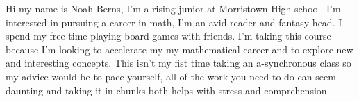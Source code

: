 Hi my name is Noah Berns, I’m a rising junior at Morristown High school. I’m interested in pursuing a career in math, I’m an avid reader and fantasy head. I spend my free time playing board games with
friends. I’m taking this course because I’m looking to accelerate my my mathematical career and to explore new and interesting concepts. This isn't my fist time taking an a-synchronous class so my advice would be to pace yourself, all of the work you need to do can seem daunting and taking it in chunks both helps with stress and comprehension.